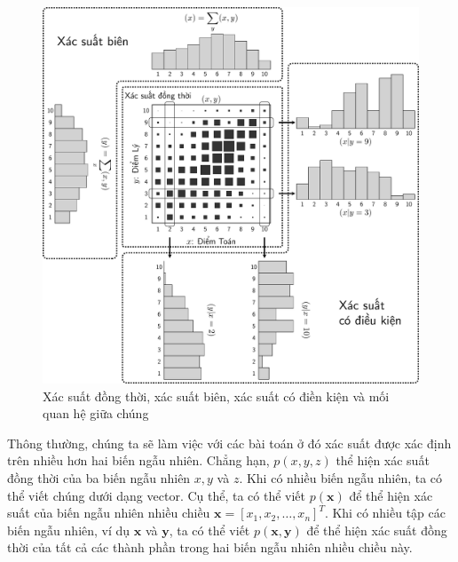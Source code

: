 

\begin{figure}[t]
\centering
\includegraphics[width = \textwidth]{Chapters/02_LinearAlgebra/30_prob/latex/joint.pdf}
\caption[]{Xác suất đồng thời, xác suất biên, xác suất có điền kiện và mối quan hệ giữa chúng}
\label{fig:30_1}
\end{figure}

Thông thường, chúng ta sẽ làm việc với các bài toán ở đó xác suất được xác định
trên nhiều hơn hai biến ngẫu nhiên. Chẳng hạn, $p(x, y, z)$ thể hiện xác suất
đồng thời của ba biến ngẫu nhiên $x,y$ và $z$. Khi có nhiều biến ngẫu nhiên, ta
có thể viết chúng dưới dạng vector. Cụ thể, ta có thể viết $p(\mathbf{x})$ để
thể hiện xác suất của biến ngẫu nhiên nhiều chiều $\mathbf{x} =
[x_1, x_2, \dots, x_n]^T$. Khi có nhiều tập các biến ngẫu nhiên, ví dụ
$\mathbf{x}$ và $\mathbf{y}$, ta có thể viết $p(\mathbf{x},
\mathbf{y})$ để thể hiện xác suất đồng thời của tất cả các thành phần trong
hai biến ngẫu nhiên nhiều chiều này.


